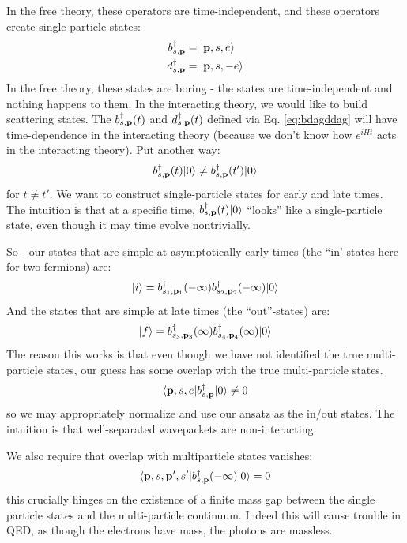 In the free theory, these operators are time-independent, and these operators create single-particle states:
\begin{equation}
    \begin{split}
        b^\dagger_{s, \mathbf{p}} &= \lvert \mathbf{p}, s, e \rangle
        \\ d^\dagger_{s, \mathbf{p}} &= \lvert \mathbf{p}, s, -e \rangle
    \end{split}
\end{equation}
In the free theory, these states are boring - the states are time-independent and nothing happens to them. In the interacting theory, we would like to build scattering states. The $b^\dagger_{s, \mathbf{p}}(t)$ and $d^\dagger_{s, \mathbf{p}}(t)$ defined via Eq. \eqref{eq:bdagddag} will have time-dependence in the interacting theory (because we don't know how $e^{iHt}$ acts in the interacting theory). Put another way:
\begin{equation}
    b^\dagger_{s, \mathbf{p}}(t) \lvert 0 \rangle \neq b^\dagger_{s, \mathbf{p}}(t') \lvert 0 \rangle
\end{equation}
for $t \neq t'$. We want to construct single-particle states for early and late times. The intuition is that at a specific time, $b^\dagger_{s, \mathbf{p}}(t) \lvert 0 \rangle$ ``looks'' like a single-particle state, even though it may time evolve nontrivially.

So - our states that are simple at asymptotically early times (the ``in'-states here for two fermions) are:
\begin{equation}
    \lvert i \rangle = b^\dagger_{s_1, \mathbf{p}_1}(-\infty)b^\dagger_{s_2, \mathbf{p}_2}(-\infty)\lvert 0 \rangle
\end{equation}
And the states that are simple at late times (the ``out''-states) are:
\begin{equation}
    \lvert f \rangle = b^\dagger_{s_3, \mathbf{p}_3}(\infty)b^\dagger_{s_4, \mathbf{p}_4}(\infty)\lvert 0 \rangle
\end{equation}
The reason this works is that even though we have not identified the true multi-particle states, our guess has some overlap with the true multi-particle states.
\begin{equation}
    \langle \mathbf{p}, s, e \rvert b^\dagger_{s, \mathbf{p}}\lvert 0 \rangle \neq 0
\end{equation}
so we may appropriately normalize and use our ansatz as the in/out states. The intuition is that well-separated wavepackets are non-interacting.

We also require that overlap with multiparticle states vanishes:
\begin{equation}
    \langle \mathbf{p}, s, \mathbf{p}', s' \rvert b^\dagger_{s, \mathbf{p}}(-\infty)\lvert 0 \rangle = 0
\end{equation}
this crucially hinges on the existence of a finite mass gap between the single particle states and the multi-particle continuum. Indeed this will cause trouble in QED, as though the electrons have mass, the photons are massless.

